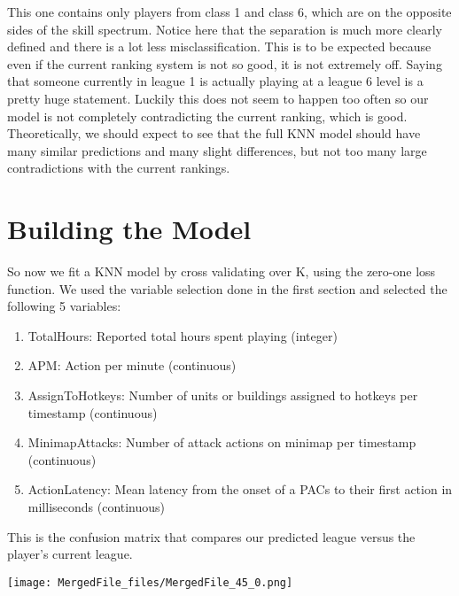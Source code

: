 \documentclass[letterpaper,10pt,english]{/usr/share/sphinx/texinputs/sphinxhowto}
\newenvironment{InvisibleVerbatim}
        {\begin{mdframed}[leftmargin=0.1\linewidth,innerleftmargin=3pt,innerrightmargin=3pt, userdefinedwidth=1\linewidth, linewidth=0pt, linecolor=white, usetwoside=false]}
        {\end{mdframed}}
\begin{document}
        
    
This one contains only players from class 1 and class 6, which are on
the opposite sides of the skill spectrum. Notice here that the
separation is much more clearly defined and there is a lot less
misclassification. This is to be expected because even if the current
ranking system is not so good, it is not extremely off. Saying that
someone currently in league 1 is actually playing at a league 6 level is
a pretty huge statement. Luckily this does not seem to happen too often
so our model is not completely contradicting the current ranking, which
is good. Theoretically, we should expect to see that the full KNN model
should have many similar predictions and many slight differences, but
not too many large contradictions with the current rankings.\part{Building the Model}So now we fit a KNN model by cross validating over K, using the zero-one
loss function. We used the variable selection done in the first section
and selected the following 5 variables:

\begin{enumerate}[1.]
\item
  TotalHours: Reported total hours spent playing (integer)
\item
  APM: Action per minute (continuous)
\item
  AssignToHotkeys: Number of units or buildings assigned to hotkeys per
  timestamp (continuous)
\item
  MinimapAttacks: Number of attack actions on minimap per timestamp
  (continuous)
\item
  ActionLatency: Mean latency from the onset of a PACs to their first
  action in milliseconds (continuous)
\end{enumerate}


This is the confusion matrix that compares our predicted league versus
the player's current league.

    

        
        

            
                \begin{InvisibleVerbatim}
                \vspace{-0.5\baselineskip}
    \begin{center}
    \texttt{[image: MergedFile\_files/MergedFile\_45\_0.png]}
    \par
    \end{center}
    
            \end{InvisibleVerbatim}
            
\end{document}
